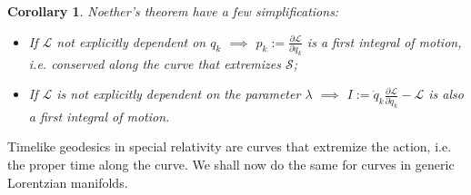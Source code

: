 \documentclass[a4paper]{article}
\theoremstyle{new}
\newtheorem{cor}{Corollary}[section]
\begin{document}
\begin{cor}
Noether's theorem have a few simplifications:
\begin{itemize}
    \item If $\mathcal{L}$ not explicitly dependent on $q_k$ $\implies$ $p_k:=\frac{\partial\mathcal{L}}{\partial\dot{q}_k}$ is a first integral of motion, i.e. conserved along the curve that extremizes $\mathcal{S}$;
    \item If $\mathcal{L}$ is not explicitly dependent on the parameter $\lambda$ $\implies$ $I:=\dot{q}_k\frac{\partial\mathcal{L}}{\partial\dot{q}_k}-\mathcal{L}$ is also a first integral of motion.
\end{itemize}
\end{cor}
Timelike geodesics in special relativity are curves that extremize the action, i.e. the proper time along the curve. We shall now do the same for curves in generic Lorentzian manifolds.
\end{document}
